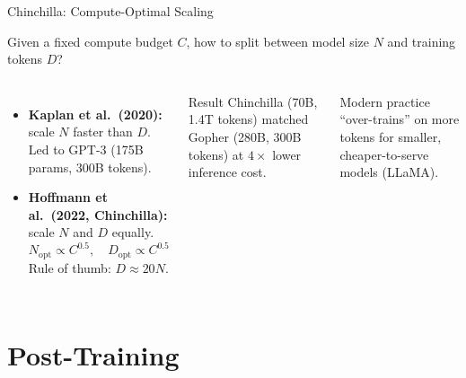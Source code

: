 \documentclass[aspectratio=169, professionalfonts]{beamer}
\begin{document}
\begin{frame}{Chinchilla: Compute-Optimal Scaling}

Given a fixed compute budget $C$, how to split between
model size $N$ and training tokens $D$?

\bigskip

\begin{columns}[c]
\begin{itemize}
  \item \textbf{Kaplan et al.\ (2020):}
    scale $N$ faster than $D$.
    Led to GPT-3 (175B params, 300B tokens).
  \item \textbf{Hoffmann et al.\ (2022, Chinchilla):}
    scale $N$ and $D$ equally.
    $$N_\text{opt} \propto C^{0.5},
      \quad D_\text{opt} \propto C^{0.5}$$
    Rule of thumb: $D \approx 20N$.
\end{itemize}

\begin{alertblock}{Result}
Chinchilla (70B, 1.4T tokens) matched
Gopher (280B, 300B tokens) at $4\times$ lower
inference cost.
\end{alertblock}

\smallskip

Modern practice ``over-trains'' on
more tokens for smaller, cheaper-to-serve models (LLaMA).
\end{columns}

\end{frame}

\section{Post-Training}
\end{document}
